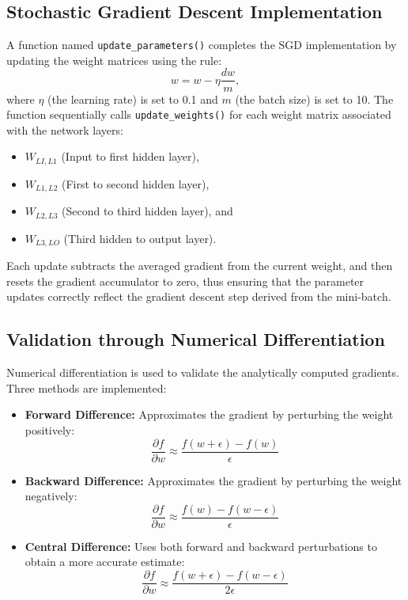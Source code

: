\subsection{Stochastic Gradient Descent Implementation}

A function named \texttt{update\_parameters()}  completes the SGD implementation by updating the weight matrices using the rule:
\[
    w = w - \eta \frac{dw}{m},
\]
where \(\eta\) (the learning rate) is set to 0.1 and \(m\) (the batch size) is set to 10. The function sequentially calls \texttt{update\_weights()} for each weight matrix associated with the network layers:
\begin{itemize}
    \item \(W_{LI,L1}\) (Input to first hidden layer),
    \item \(W_{L1,L2}\) (First to second hidden layer),
    \item \(W_{L2,L3}\) (Second to third hidden layer), and
    \item \(W_{L3,LO}\) (Third hidden to output layer).
\end{itemize}
Each update subtracts the averaged gradient from the current weight, and then resets the gradient accumulator to zero, thus ensuring that the parameter updates correctly reflect the gradient descent step derived from the mini-batch.


\subsection{Validation through Numerical Differentiation}

Numerical differentiation is used to validate the analytically computed gradients. Three methods are implemented:

\begin{itemize}
    \item \textbf{Forward Difference:} Approximates the gradient by perturbing the weight positively:
    \[
        \frac{\partial f}{\partial w} \approx \frac{f(w + \epsilon) - f(w)}{\epsilon}
    \]
    \item \textbf{Backward Difference:} Approximates the gradient by perturbing the weight negatively:
    \[
        \frac{\partial f}{\partial w} \approx \frac{f(w) - f(w - \epsilon)}{\epsilon}
    \]
    \item \textbf{Central Difference:} Uses both forward and backward perturbations to obtain a more accurate estimate:
    \[
        \frac{\partial f}{\partial w} \approx \frac{f(w + \epsilon) - f(w - \epsilon)}{2\epsilon}
    \]
\end{itemize}

